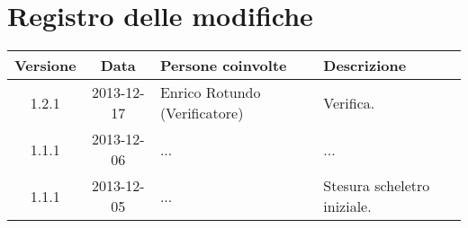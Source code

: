 \section*{Registro delle modifiche}

\small{
\begin{tabularx}{\textwidth}{|c|c|l|X|}
 \hline \textbf{Versione} & \textbf{Data} & \textbf{Persone coinvolte} & \textbf{Descrizione} \\


 
 \hline 1.2.1 & 2013-12-17 & Enrico Rotundo (Verificatore) & Verifica. \\

 \hline 1.1.1 & 2013-12-06 & ... &
 ... \\

 \hline 1.1.1 & 2013-12-05 & ... &
 Stesura scheletro iniziale. \\

 \hline
\end{tabularx}
}
